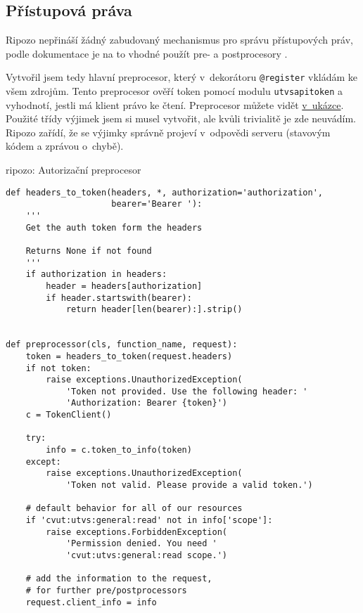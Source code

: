 \subsection{Přístupová práva}\label{pux159uxedstupovuxe1-pruxe1va}

Ripozo nepřináší žádný zabudovaný mechanismus pro správu přístupových práv, podle dokumentace je na to vhodné použít pre- a postprocesory \autocite{ripozoprepost}.

Vytvořil jsem tedy hlavní preprocesor, který v~dekorátoru \verb!@register! vkládám ke všem zdrojům. Tento preprocesor ověří token pomocí modulu \verb!utvsapitoken! a vyhodnotí, jestli má klient právo ke čtení. Preprocesor můžete vidět \protect\hyperlink{code:ripozo:auth}{v~ukázce}. Použité třídy výjimek jsem si musel vytvořit, ale kvůli trivialitě je zde neuvádím. Ripozo zařídí, že se výjimky správně projeví v~odpovědi serveru (stavovým kódem a zprávou o~chybě).

\begin{listing}[htbp]
\caption{{\label{code:ripozo:auth}ripozo: Autorizační preprocesor}}
\begin{verbatim}
def headers_to_token(headers, *, authorization='authorization',
                     bearer='Bearer '):
    '''
    Get the auth token form the headers

    Returns None if not found
    '''
    if authorization in headers:
        header = headers[authorization]
        if header.startswith(bearer):
            return header[len(bearer):].strip()


def preprocessor(cls, function_name, request):
    token = headers_to_token(request.headers)
    if not token:
        raise exceptions.UnauthorizedException(
            'Token not provided. Use the following header: '
            'Authorization: Bearer {token}')
    c = TokenClient()

    try:
        info = c.token_to_info(token)
    except:
        raise exceptions.UnauthorizedException(
            'Token not valid. Please provide a valid token.')

    # default behavior for all of our resources
    if 'cvut:utvs:general:read' not in info['scope']:
        raise exceptions.ForbiddenException(
            'Permission denied. You need '
            'cvut:utvs:general:read scope.')

    # add the information to the request,
    # for further pre/postprocessors
    request.client_info = info
\end{verbatim}
\end{listing}

